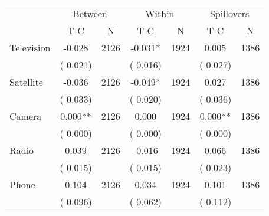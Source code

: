 
\begin{tabular}{l*{6}{c}}\hline&\multicolumn{2}{c}{Between}&\multicolumn{2}{c}{Within}&\multicolumn{2}{c}{Spillovers} \\ \cmidrule(r){2-3}\cmidrule(l){4-5}\cmidrule(l){6-7} & {T-C} & {N} & {T-C} & {N}  & {T-C}  & {N}  \\ \midrule
Television        &             -0.028      &       2126       &             -0.031*      &       1924       &              0.005      &       1386       \\
                       &       (       0.021)            &                               &       (       0.016)            &                               &       (       0.027)            &                               \\
Satellite        &             -0.036      &       2126       &             -0.049*      &       1924       &              0.027      &       1386       \\
                       &       (       0.033)            &                               &       (       0.020)            &                               &       (       0.036)            &                               \\
Camera        &              0.000**      &       2126       &              0.000      &       1924       &              0.000**      &       1386       \\
                       &       (       0.000)            &                               &       (       0.000)            &                               &       (       0.000)            &                               \\
Radio        &              0.039      &       2126       &             -0.016      &       1924       &              0.066      &       1386       \\
                       &       (       0.015)            &                               &       (       0.015)            &                               &       (       0.023)            &                               \\
Phone        &              0.104      &       2126       &              0.034      &       1924       &              0.101      &       1386       \\
                       &       (       0.096)            &                               &       (       0.062)            &                               &       (       0.112)            &                               \\
\hline \end{tabular}
